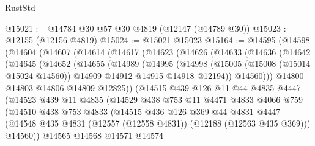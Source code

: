 \begin{lexlean}{RustStd}
\begin{coremodule}
{\begin{coremodule}
{{{{{{{{{{{{{{{{{{{{{{{{{{{{{{{{{{{{{{{{{{{{{{{{{{{{{{{{{{{{{{{{{{{{@15021 := @14784 @30 @57 @30 @4819 (@12147 (@14789 @30))
@15023 := @12155 (@12156 @4819)
@15024 := @15021 @15023
@15164 := @14595
    (@14598
      (@14604
        (@14607
          (@14614
            (@14617
              (@14623
                (@14626
                  (@14633
                    (@14636
                      (@14642
                        (@14645
                          (@14652
                            (@14655
                              (@14989
                                (@14995
                                  (@14998
                                    (@15005
                                      (@15008 (@15014 @15024 @14560))
                                      @14909
                                      @14912
                                      @14915
                                      @14918
                                      @12194))
                                  @14560)))
                            @14800
                            @14803
                            @14806
                            @14809
                            @12825))
                        (@14515
                          @439
                          @126
                          @11
                          @44
                          @4835
                          @4447
                          (@14523
                            @439
                            @11
                            @4835
                            (@14529
                              @438
                              @753
                              @11
                              @4471
                              @4833
                              @4066
                              @759
                              (@14510
                                @438
                                @753
                                @4833
                                (@14515
                                  @436
                                  @126
                                  @369
                                  @44
                                  @4831
                                  @4447
                                  (@14548
                                    @435
                                    @4831
                                    (@12557 (@12558 @4831))
                                    (@12188 (@12563 @435 @369)))
                                  @14560))
                              @14565
                              @14568
                              @14571
                              @14574
}}}}}}}}}}}}}}}}}}}}}}}}}}}}}}}}}}}}}}}}}}}}}}}}}}}}}}}}}}}}}}}}}}}}
\end{coremodule}}
\end{coremodule}
\end{lexlean}
